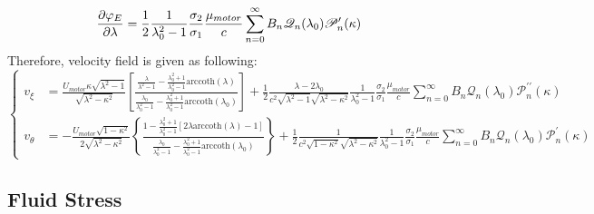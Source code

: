 \documentclass[fontsize=11pt, %
                             paper=a4, %
                             twoside, %
                             captions=tableheading,
                             index=totoc,
                             hyperref]{labbook}
\begin{document}
\begin{addmargin}[4cm]{0cm}
\begin{equation}
\begin{aligned}
\frac{\partial \varphi_E}{\partial \lambda}&=\frac{1}{2}\frac{1}{\lambda_0^2-1}\frac{\sigma_2}{\sigma_1}\frac{\mu_{motor}}{c}\sum_{n=0}^\infty B_n \mathscr{Q}_n(\lambda_0)\mathscr{P}_n^\prime(\kappa)
\end{aligned}
\end{equation}
Therefore, velocity field is given as following:
\begin{equation}
\left\{
\begin{aligned}
v_\xi&=\frac{U_{motor}\kappa\sqrt{\lambda^2-1}}{\sqrt{\lambda^2-\kappa^2}}\left[\frac{\frac{\lambda}{\lambda^2-1}-\frac{\lambda_0^2+1}{\lambda_0^2-1}\mathrm{arccoth}(\lambda)}{\frac{\lambda_0}{\lambda_0^2-1}-\frac{\lambda_0^2+1}{\lambda_0^2-1}\mathrm{arccoth}(\lambda_0)}\right]+\frac{1}{2}\frac{\lambda-2\lambda_0}{c^2\sqrt{\lambda^2-1}\sqrt{\lambda^2-\kappa^2}}\frac{1}{\lambda_0^2-1}\frac{\sigma_2}{\sigma_1}\frac{\mu_{motor}}{c}\sum_{n=0}^\infty B_n\mathscr{Q}_n(\lambda_0)\mathscr{P}_n^{\prime\prime}(\kappa)\\
v_\theta&=-\frac{U_{motor}\sqrt{1-\kappa^2}}{2\sqrt{\lambda^2-\kappa^2}}\left\{\frac{1-\frac{\lambda_0^2+1}{\lambda_0^2-1}\left[2\lambda\mathrm{arccoth}(\lambda)-1\right]}{\frac{\lambda_0}{\lambda_0^2-1}-\frac{\lambda_0^2+1}{\lambda_0^2-1}\mathrm{arccoth}(\lambda_0)}\right\}+\frac{1}{2}\frac{1}{c^2\sqrt{1-\kappa^2}\sqrt{\lambda^2-\kappa^2}}\frac{1}{\lambda_0^2-1}\frac{\sigma_2}{\sigma_1}\frac{\mu_{motor}}{c}\sum_{n=0}^\infty B_n \mathscr{Q}_n(\lambda_0)\mathscr{P}_n^\prime(\kappa)
\end{aligned}
\right.
\end{equation}
\subsection{Fluid Stress}

\end{addmargin}
\end{document}
